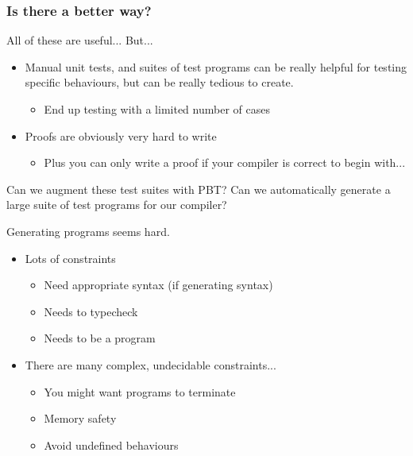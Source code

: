 \documentclass{beamer}
\begin{document}
\begin{frame}
  \frametitle{Is there a better way?}

  All of these are useful... But...
  
  \begin{itemize}
  \item Manual unit tests, and suites of test programs can be really
    helpful for testing specific behaviours, but can be really tedious
    to create.
    \begin{itemize}
    \item End up testing with a limited number of cases
    \end{itemize}
  \item Proofs are obviously very hard to write
    \begin{itemize}
    \item Plus you can only write a proof if your compiler is correct
      to begin with... %
    \end{itemize}
  \end{itemize}

  Can we augment these test suites with PBT? Can we automatically
  generate a large suite of test programs for our compiler?

\end{frame}

\begin{frame}

  Generating programs seems hard.

  \begin{itemize}
  \item Lots of constraints
    \begin{itemize}
    \item Need appropriate syntax (if generating syntax)
    \item Needs to typecheck
    \item Needs to be a program
    \end{itemize}
  \item There are many complex, undecidable constraints...
    \begin{itemize}
    \item You might want programs to terminate
    \item Memory safety
    \item Avoid undefined behaviours
    \end{itemize}
  \end{itemize}
\end{frame}
\end{document}
